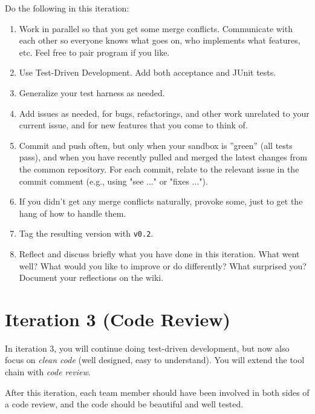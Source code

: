 \documentclass[swedish,english]{article}
\begin{document}
Do the following in this iteration:

\begin{enumerate}
\item Work in parallel so that you get some merge conflicts. Communicate with each other so everyone knows what goes on, who implements what features, etc. Feel free to pair program if you like.
\item Use Test-Driven Development. Add both acceptance and JUnit tests.
\item Generalize your test harness as needed.
\item Add issues as needed, for bugs, refactorings, and other work unrelated to your current issue, and for new features that you come to think of. 
\item Commit and push often, but only when your sandbox is ''green'' (all tests pass), and when you have recently pulled and merged the latest changes from the common repository. For each commit, relate to the relevant issue in the commit comment (e.g., using "see ..." or "fixes ...").
\item If you didn't get any merge conflicts naturally, provoke some, just to get the hang of how to handle them.
\item Tag the resulting version with \verb'v0.2'.
\item Reflect and discuss briefly what you have done in this iteration. What went well? What would you like to improve or do differently? What surprised you? Document your reflections on the wiki.
\end{enumerate}

\section*{Iteration 3 (Code Review)}
In iteration 3, you will continue doing test-driven development, but now also focus on \emph{clean code} (well designed, easy to understand). You will extend the tool chain with \emph{code review}.

After this iteration, each team member should have been involved in both sides of a code review, and the code should be beautiful and well tested.
\end{document}
